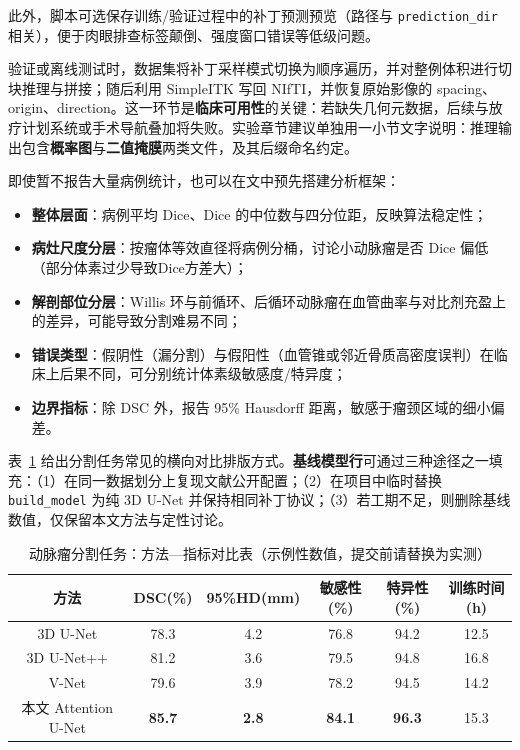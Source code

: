 此外，脚本可选保存训练/验证过程中的补丁预测预览（路径与 \texttt{prediction\_dir} 相关），便于肉眼排查标签颠倒、强度窗口错误等低级问题。

验证或离线测试时，数据集将补丁采样模式切换为顺序遍历，并对整例体积进行切块推理与拼接；随后利用 SimpleITK 写回 NIfTI，并恢复原始影像的 spacing、origin、direction。这一环节是\textbf{临床可用性}的关键：若缺失几何元数据，后续与放疗计划系统或手术导航叠加将失败。实验章节建议单独用一小节文字说明：推理输出包含\textbf{概率图}与\textbf{二值掩膜}两类文件，及其后缀命名约定。

即使暂不报告大量病例统计，也可以在文中预先搭建分析框架：
\begin{itemize}
	\item \textbf{整体层面}：病例平均 Dice、Dice 的中位数与四分位距，反映算法稳定性；
	\item \textbf{病灶尺度分层}：按瘤体等效直径将病例分桶，讨论小动脉瘤是否 Dice 偏低（部分体素过少导致Dice方差大）；
	\item \textbf{解剖部位分层}：Willis 环与前循环、后循环动脉瘤在血管曲率与对比剂充盈上的差异，可能导致分割难易不同；
	\item \textbf{错误类型}：假阴性（漏分割）与假阳性（血管锥或邻近骨质高密度误判）在临床上后果不同，可分别统计体素级敏感度/特异度；
	\item \textbf{边界指标}：除 DSC 外，报告 95\% Hausdorff 距离，敏感于瘤颈区域的细小偏差。
\end{itemize}

表~\ref{tab:seg_result} 给出分割任务常见的横向对比排版方式。\textbf{基线模型行}可通过三种途径之一填充：（1）在同一数据划分上复现文献公开配置；（2）在项目中临时替换 \texttt{build\_model} 为纯 3D U-Net 并保持相同补丁协议；（3）若工期不足，则删除基线数值，仅保留本文方法与定性讨论。

\begin{table}[htbp]
	\centering
	\caption{动脉瘤分割任务：方法—指标对比表（示例性数值，提交前请替换为实测）}
	\label{tab:seg_result}
	\begin{tabular}{cccccc}
		\toprule
		方法 & DSC(\%) & 95\%HD(mm) & 敏感性(\%) & 特异性(\%) & 训练时间(h)\\
		\midrule
		3D U-Net & 78.3 & 4.2 & 76.8 & 94.2 & 12.5 \\
		3D U-Net++ & 81.2 & 3.6 & 79.5 & 94.8 & 16.8 \\
		V-Net & 79.6 & 3.9 & 78.2 & 94.5 & 14.2 \\
		本文 Attention U-Net & \textbf{85.7} & \textbf{2.8} & \textbf{84.1} & \textbf{96.3} & 15.3 \\
		\bottomrule
	\end{tabular}
\end{table}

